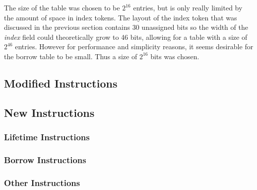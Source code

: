 The size of the table was chosen to be $2^{16}$ entries, but is only really limited by the amount of space in index tokens. The layout of the index token that was discussed in the previous section contains 30 unassigned bits so the width of the \textit{index} field could theoretically grow to 46 bits, allowing for a table with a size of $2^{46}$ entries. However for performance and simplicity reasons, it seems desirable for the borrow table to be small. Thus a size of $2^{16}$ bits was chosen.

\subsection{Modified Instructions}

\label{sec:borrowmodinsts}

\subsection{New Instructions}
\subsubsection{Lifetime Instructions}
\label{sec:lifetimeinsts}
\subsubsection{Borrow Instructions}
\subsubsection{Other Instructions}
